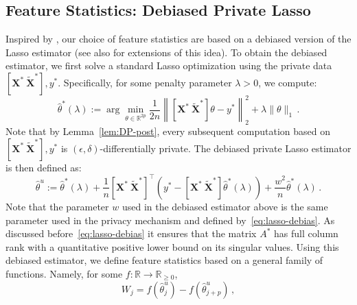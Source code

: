 \documentclass[11pt]{article}
\newcommand{\bX}{\boldsymbol{X}}
\newcommand{\bXT}{\widetilde{\bX} }
\newcommand{\mbR}{\mathbb{R}}
\newcommand{\hth}{\widehat{\theta}}
\begin{document}
\subsection{Feature Statistics: Debiased Private Lasso}\label{sec:feature-statistics}
Inspired by \cite{JM14}, our choice of feature statistics are based on a debiased version of the Lasso estimator (see also \cite{javanmard2018debiasing,javanmard2019false,javanmard2013nearly,javanmard2020flexible,deshpande2023online} for extensions of this idea). To obtain the debiased estimator, we first solve a standard Lasso optimization using the private data $[\bX^*\ \bXT^*],y^*$. Specifically, for some penalty parameter $\lambda>0$, we compute:
\begin{equation}\label{eq:lasso-JL}
    \hth^*(\lambda) := \arg\min_{\theta\in\mbR^{2p}}\frac{1}{2n}\left\|[\bX^*\ \bXT^*]\theta - y^*\right\|_2^2+\lambda\|\theta\|_1\,.
\end{equation}
Note that by Lemma~\ref{lem:DP-post}, every subsequent computation based on $[\bX^*\ \bXT^*],y^*$ is $(\epsilon,\delta)$-differentially private. The debiased private Lasso estimator is then defined as:
\begin{equation}\label{eq:lasso-debias}
    \hth^u := \hth^*(\lambda) +\frac{1}{n}[\bX^*\ \bXT^*]^\top(y^*-[\bX^*\ \bXT^*]\hth^*(\lambda))+\frac{w^2}{n }\hth^*(\lambda) \,.
\end{equation}
Note that the parameter $w$ used in the debiased estimator above is the same parameter used in the privacy mechanism and defined by~\eqref{eq:lasso-debias}. As discussed before~\eqref{eq:lasso-debias} it ensures that the matrix $A^*$ has full column rank with a quantitative positive lower bound on its singular values.
Using this debiased estimator, we define feature statistics based on a general family of functions. Namely, for some $f:\mbR\to\mbR_{\ge 0}$,
\begin{equation}\label{eq:W-feat-stat}
    W_j = f(\hth^u_j)-f(\hth^u_{j+p})\,,
\end{equation} 
\end{document}
